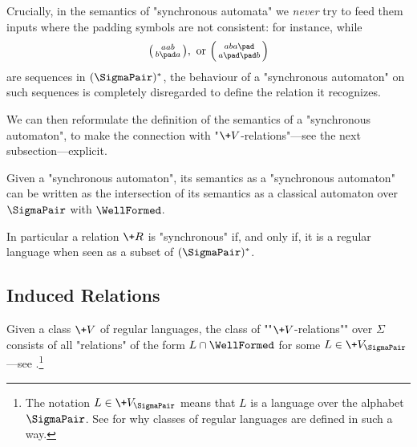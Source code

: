 \begin{remark}
	\AP\label{rk:semantic}
	Crucially, in the semantics of "synchronous automata" we \emph{never}
	try to feed them inputs where the padding symbols are not consistent: for instance, while
	\[
		\pair{aab}{b\pad a},
		\text{ or }
		\pair{aba\pad}{a\pad\pad b}	
	\]
	are sequences in $(\SigmaPair)^*$, the behaviour of a "synchronous automaton"
	on such sequences is completely disregarded to define the relation it recognizes. 
\end{remark}

We can then reformulate the definition of the semantics of a "synchronous automaton",
to make the connection with "$\+V$-relations"---see the next subsection---explicit.

\begin{fact}
	\AP\label{fact:synchronous-is-regular}
	Given a "synchronous automaton", its semantics as a "synchronous automaton"
	can be written as the intersection of its semantics as a classical automaton over $\SigmaPair$
	with $\WellFormed$.
\end{fact}

In particular a relation $\+R$ is "synchronous" if, and only if, it is a regular language when seen as a subset of $(\SigmaPair)^*$.

\subsection{Induced Relations}

Given a class $\+V$ of regular languages,
the class of \AP""$\+V$-relations"" over $\Sigma$ consists of all "relations"
of the form $L \cap \WellFormed$ for some $L \in \+V_{\SigmaPair}$---see .\footnote{The notation $L \in \+V_{\SigmaPair}$ means that $L$ is a language over
the alphabet $\SigmaPair$. See \cite[introduction of \S{}XIII.1]{Pin2022MathematicalFoundations}
for why classes of regular languages are defined in such a way.}

